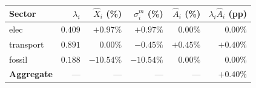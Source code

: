 \begin{tabular}{lrrrrr}
\hline
Sector & $\lambda_i$ & $\hat X_i$ (\%) & $\sigma_i^m$ (\%) & $\hat A_i$ (\%) & $\lambda_i \hat A_i$ (pp) \\
\hline
elec & $0.409$ & $+0.97 \% $ & $+0.97 \% $ & $0.00 \% $ & $0.00 \% $ \\
transport & $0.891$ & $0.00 \% $ & $-0.45 \% $ & $+0.45 \% $ & $+0.40 \% $ \\
fossil & $0.188$ & $-10.54 \% $ & $-10.54 \% $ & $0.00 \% $ & $0.00 \% $ \\
\hline
\textbf{Aggregate} & --- & --- & --- & --- & $+0.40 \% $ \\
\hline
\end{tabular}
